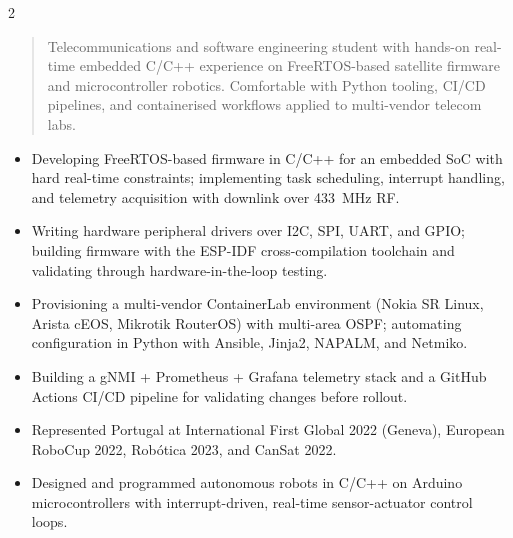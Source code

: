 \documentclass[10pt,a4paper,ragged2e,withhyper]{altacv}
\begin{document}
\begin{paracol}{2}

        \newpage

        \switchcolumn

            \begin{quote}
            Telecommunications and software engineering student with hands-on real-time embedded C/C++ experience on FreeRTOS-based satellite firmware and microcontroller robotics. Comfortable with Python tooling, CI/CD pipelines, and containerised workflows applied to multi-vendor telecom labs.
            \end{quote}

            \begin{itemize}
                \item Developing FreeRTOS-based firmware in C/C++ for an embedded SoC with hard real-time constraints; implementing task scheduling, interrupt handling, and telemetry acquisition with downlink over 433~MHz RF.
                \item Writing hardware peripheral drivers over I2C, SPI, UART, and GPIO; building firmware with the ESP-IDF cross-compilation toolchain and validating through hardware-in-the-loop testing.
            \end{itemize}

            \begin{itemize}
                \item Provisioning a multi-vendor ContainerLab environment (Nokia SR Linux, Arista cEOS, Mikrotik RouterOS) with multi-area OSPF; automating configuration in Python with Ansible, Jinja2, NAPALM, and Netmiko.
                \item Building a gNMI + Prometheus + Grafana telemetry stack and a GitHub Actions CI/CD pipeline for validating changes before rollout.
            \end{itemize}

            \begin{itemize}
                \item Represented Portugal at International First Global 2022 (Geneva), European RoboCup 2022, Robótica 2023, and CanSat 2022.
                \item Designed and programmed autonomous robots in C/C++ on Arduino microcontrollers with interrupt-driven, real-time sensor-actuator control loops.
            \end{itemize}
            \divider


\end{paracol}
\end{document}
